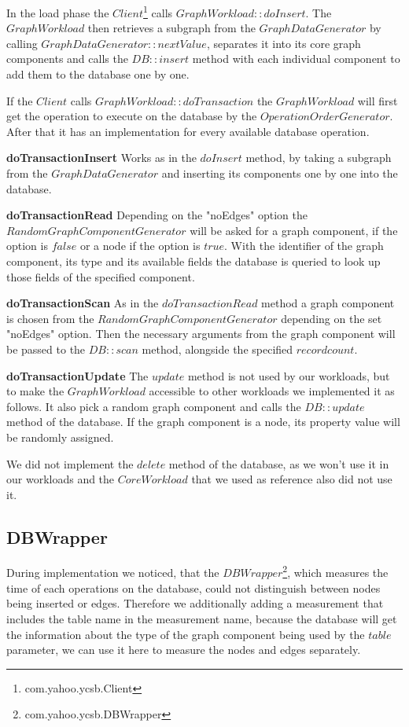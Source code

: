 In the load phase the $ Client $\footnote{com.yahoo.ycsb.Client} calls $ GraphWorkload::doInsert $.
The $ GraphWorkload $ then retrieves a subgraph from the $ GraphDataGenerator $ by calling $ GraphDataGenerator::nextValue $,
separates it into its core graph components and calls the $ DB::insert $ method with each individual component to add them to the database one by one.

If the $ Client $ calls $ GraphWorkload::doTransaction $ the $ GraphWorkload $ will first get the operation to execute on the database by the $ OperationOrderGenerator $.
After that it has an implementation for every available database operation.

\textbf{doTransactionInsert} \newline
Works as in the $ doInsert $ method,
by taking a subgraph from the $ GraphDataGenerator $ and inserting its components one by one into the database.

\textbf{doTransactionRead}
Depending on the "noEdges" option the $ RandomGraphComponentGenerator $ will be asked for a graph component,
if the option is $ false $ or a node if the option is $ true $.
With the identifier of the graph component,
its type and its available fields the database is queried to look up those fields of the specified component.

\textbf{doTransactionScan} \newline
As in the $ doTransactionRead $ method a graph component is chosen from the $ RandomGraphComponentGenerator $ depending on the set "noEdges" option.
Then the necessary arguments from the graph component will be passed to the $ DB::scan $ method,
alongside the specified $ recordcount $.

\textbf{doTransactionUpdate} \newline
The $ update $ method is not used by our workloads,
but to make the $ GraphWorkload $ accessible to other workloads we implemented it as follows.
It also pick a random graph component and calls the $ DB::update $ method of the database.
If the graph component is a node,
its property value will be randomly assigned.

We did not implement the $ delete $ method of the database,
as we won't use it in our workloads and the $ CoreWorkload $ that we used as reference also did not use it.

\subsection{DBWrapper}
During implementation we noticed,
that the $ DBWrapper $\footnote{com.yahoo.ycsb.DBWrapper},
which measures the time of each operations on the database,
could not distinguish between nodes being inserted or edges.
Therefore we additionally adding a measurement that includes the table name in the measurement name,
because the database will get the information about the type of the graph component being used by the $ table $ parameter,
we can use it here to measure the nodes and edges separately.

